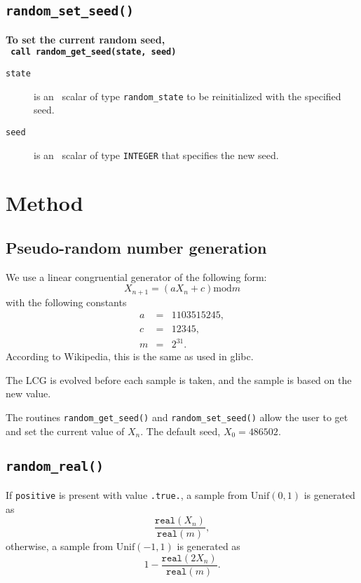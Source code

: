 \subsection{\texttt{random\_set\_seed()}}

\textbf{\noindent
   To set the current random seed,
   \vspace*{0.1cm} \\
   \texttt{ \hspace*{0.2cm}
      call random\_get\_seed(state, seed)
   }
   \vspace{0.3cm}
}

\begin{description}

\item[\texttt{state}] is an \intentinout\ scalar of type {\tt random\_state} to
   be reinitialized with the specified seed.

\item[\texttt{seed}] is an \intentin\ scalar of type {\tt INTEGER} that
   specifies the new seed.

\end{description}

\section{Method} \label{method}

\subsection{Pseudo-random number generation}
We use a linear congruential generator of the following form:
$$
   X_{n+1} = (aX_n + c) \mathrm{mod} m
$$
with the following constants
\begin{eqnarray*}
   a &=& 1103515245, \\
   c &=& 12345, \\
   m &=& 2^{31}.
\end{eqnarray*}
According to Wikipedia, this is the same as used in glibc.

The LCG is evolved before each sample is taken, and the sample is based on the
new value.

The routines {\tt random\_get\_seed()} and {\tt random\_set\_seed()} allow the user to get and set the current value of $X_n$. The default seed, $X_0 = 486502$.

\subsection{\tt random\_real()}
If {\tt positive} is present with value {\tt .true.}, a sample from $\mathrm{Unif}(0,1)$ is generated as
$$
   \frac{\texttt{real}(X_n)}{\texttt{real}(m)},
$$
otherwise, a sample from $\mathrm{Unif}(-1,1)$ is generated as
$$
   1 - \frac{\texttt{real}(2X_n)}{\texttt{real}(m)}.
$$

